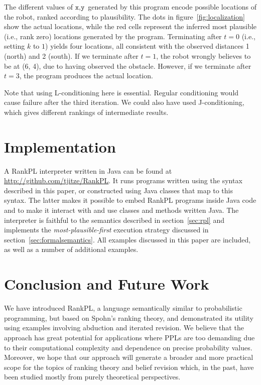 \documentclass{llncs}
\begin{document}
The different values of $\texttt{x},\texttt{y}$ generated by this program encode possible locations of the robot, ranked according to plausibility.
The dots in figure~\ref{fig:localization} show the actual locations, while the red cells represent the inferred most plausible (i.e., rank zero) locations generated by the program.
Terminating after $t = 0$ (i.e., setting $k$ to $1$) yields four locations, all consistent with the observed distances 1 (north) and 2 (south).
If we terminate after $t = 1$, the robot wrongly believes to be at (6, 4), due to having observed the obstacle.
However, if we terminate after $t = 3$, the program produces the actual location.

Note that using L-conditioning here is essential.
Regular conditioning would cause failure after the third iteration. 
We could also have used J-conditioning, which gives different rankings of intermediate results.

\section{Implementation}\label{sec:implementation}

A RankPL interpreter written in Java can be found at \url{http://github.com/tjitze/RankPL}.
It runs programs written using the syntax described in this paper, 
	or constructed using Java classes that map to this syntax.
The latter makes it possible to embed RankPL programs inside Java code
	and to make it interact with and use classes and methods written Java.
The interpreter is faithful to the semantics described in section~\ref{sec:rpl} and
	implements the \emph{most-plausible-first} execution strategy discussed in section~\ref{sec:formalsemantics}.
All examples discussed in this paper are included, as well as a number of additional examples.

\section{Conclusion and Future Work}\label{sec:conclusion}

We have introduced RankPL, a language semantically similar to probabilistic programming,
	but based on Spohn's ranking theory,
	and demonstrated its utility using examples involving abduction and iterated revision.
We believe that the approach has great potential for applications
	where PPLs are too demanding due to their computational complexity and dependence on precise probability values.
Moreover, we hope that our approach will generate a broader and more practical scope for the topics of 
	ranking theory and belief revision which, in the past, have been studied mostly from purely theoretical perspectives.
\end{document}
